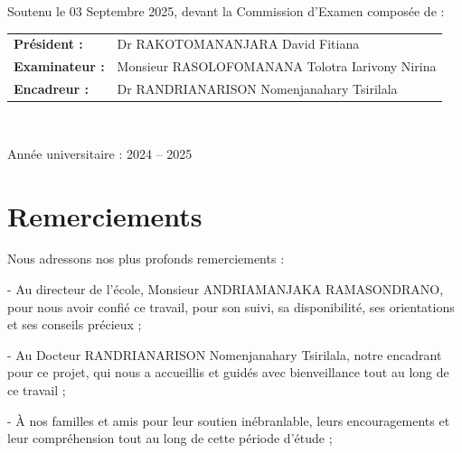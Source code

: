 \documentclass[a4paper,12pt]{article}
\begin{document}
\begin{titlepage}
\begin{center}
        
   \begin{flushleft}
        Soutenu le 03 Septembre 2025, devant la Commission d’Examen composée de : \\[0.5cm]
        \begin{tabular}{@{}ll@{}}
            \textbf{Président :}   & Dr RAKOTOMANANJARA David Fitiana\\[0.5cm]
            \textbf{Examinateur :} & Monsieur RASOLOFOMANANA Tolotra Iarivony Nirina\\[0.5cm]
            \textbf{Encadreur :}   & Dr RANDRIANARISON Nomenjanahary Tsirilala \\[1.5cm]
        \end{tabular} \\[1cm]
\end{flushleft}
        \begin{flushright}
            Année universitaire : 2024 – 2025
        \end{flushright}

    \end{center}
\end{titlepage}

\cleardoublepage


\cleardoublepage        %
\thispagestyle{empty}   %
\mbox{}                 %
\cleardoublepage

\setcounter{page}{1}  %

\chapter*{Remerciements}
\vspace{1cm}

Nous adressons nos plus profonds remerciements :

- Au directeur de l'école, Monsieur ANDRIAMANJAKA RAMASONDRANO, pour nous avoir confié ce travail, pour son suivi, sa disponibilité, ses orientations et ses conseils précieux ;

- Au Docteur RANDRIANARISON Nomenjanahary Tsirilala, notre encadrant pour ce projet, qui nous a accueillis et guidés avec bienveillance tout au long de ce travail ;

- À nos familles et amis pour leur soutien inébranlable, leurs encouragements et leur compréhension tout au long de cette période d'étude ;
\end{document}
